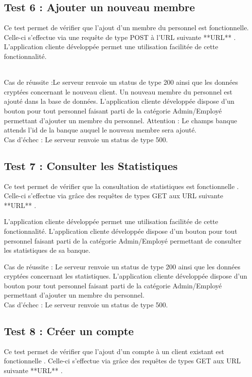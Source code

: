\subsection{Test 6 : Ajouter un nouveau membre }

Ce test permet de vérifier que l'ajout d'un membre du personnel est fonctionnelle.
Celle-ci s'effectue via une requête de type POST à l'URL suivante **URL** .
\\
L'application cliente développée permet une utilisation facilitée de cette fonctionnalité. 

\\
Cas de réussite :Le serveur renvoie un status de type 200 ainsi que les données cryptées concernant le nouveau client. Un nouveau membre du personnel est ajouté dans la base de données.
L'application cliente développée dispose d'un bouton pour tout personnel faisant parti de la catégorie Admin/Employé permettant d'ajouter un membre du personnel.
Attention : Le champs banque attends l'id de la banque auquel le nouveau membre sera ajouté.
\\
Cas d'échec : Le serveur renvoie un status de type 500.

\subsection{Test 7 : Consulter les Statistiques}
Ce test permet de vérifier que la consultation de statistiques est fonctionnelle .
Celle-ci s'effectue via grâce des requêtes de types GET aux URL suivante **URL** .

L'application cliente développée permet une utilisation facilitée de cette fonctionnalité. 
L'application cliente développée dispose d'un bouton pour tout personnel faisant parti de la catégorie Admin/Employé permettant de consulter les statistiques de sa banque.

Cas de réussite : Le serveur renvoie un status de type 200 ainsi que les données cryptées concernant les statistiques.
L'application cliente développée dispose d'un bouton pour tout personnel faisant parti de la catégorie Admin/Employé permettant d'ajouter un membre du personnel.
\\
Cas d'échec : Le serveur renvoie un status de type 500.

\subsection{Test 8 : Créer un compte }

Ce test permet de vérifier que l'ajout d'un compte à un client existant est fonctionnelle .
Celle-ci s'effectue via grâce des requêtes de types GET aux URL suivante **URL** .

